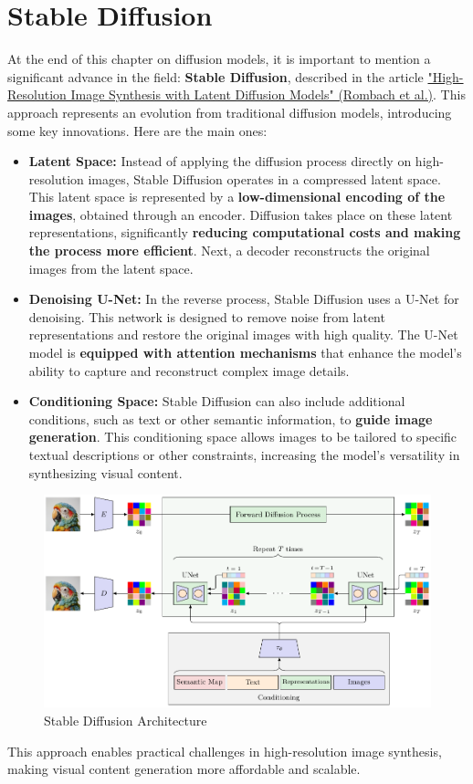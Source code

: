 \section{Stable Diffusion}

At the end of this chapter on diffusion models, it is important to mention a significant advance in the field: \textbf{Stable Diffusion}, described in the article \href{https://arxiv.org/pdf/2112.10752}{"High-Resolution Image Synthesis with Latent Diffusion Models" (Rombach et al.)}. This approach represents an evolution from traditional diffusion models, introducing some key innovations. Here are the main ones:

\begin{itemize}
    \item \textbf{Latent Space:} Instead of applying the diffusion process directly on high-resolution images, Stable Diffusion operates in a compressed latent space. This latent space is represented by a \textbf{low-dimensional encoding of the images}, obtained through an encoder. Diffusion takes place on these latent representations, significantly \textbf{reducing computational costs and making the process more efficient}. Next, a decoder reconstructs the original images from the latent space.

    \item \textbf{Denoising U-Net:} In the reverse process, Stable Diffusion uses a U-Net for denoising. This network is designed to remove noise from latent representations and restore the original images with high quality. The U-Net model is \textbf{equipped with attention mechanisms} that enhance the model's ability to capture and reconstruct complex image details.

    \item \textbf{Conditioning Space:} Stable Diffusion can also include additional conditions, such as text or other semantic information, to \textbf{guide image generation}. This conditioning space allows images to be tailored to specific textual descriptions or other constraints, increasing the model's versatility in synthesizing visual content.
\end{itemize}

\newpage
\begin{figure}[!htbp]
    \centering
    \includegraphics[width=\linewidth]{tikz/chapter10 - Stable Diffusion Architecture.pdf}
    \caption{Stable Diffusion Architecture}
\end{figure}

This approach enables practical challenges in high-resolution image synthesis, making visual content generation more affordable and scalable.
